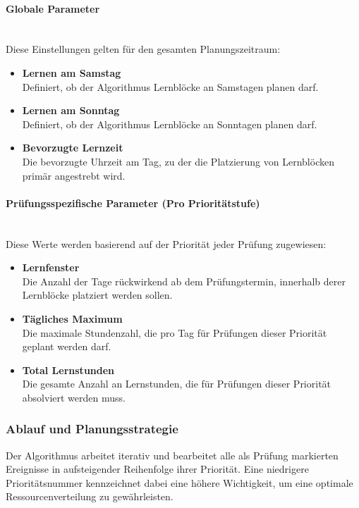 \documentclass[12pt,a4paper]{report}
\newcommand{\myparagraph}[1]{\paragraph{#1}\mbox{}\\}
\begin{document}
\myparagraph{Globale Parameter}
Diese Einstellungen gelten für den gesamten Planungszeitraum:
\begin{itemize}
    \item \textbf{Lernen am Samstag}\\
    Definiert, ob der Algorithmus Lernblöcke an Samstagen planen darf.
    \item \textbf{Lernen am Sonntag}\\
    Definiert, ob der Algorithmus Lernblöcke an Sonntagen planen darf.
    \item \textbf{Bevorzugte Lernzeit}\\
    Die bevorzugte Uhrzeit am Tag, zu der die Platzierung von Lernblöcken primär angestrebt wird.
\end{itemize}

\myparagraph{Prüfungsspezifische Parameter (Pro Prioritätstufe)}
Diese Werte werden basierend auf der Priorität jeder Prüfung zugewiesen:
\begin{itemize}
    \item \textbf{Lernfenster}\\
    Die Anzahl der Tage rückwirkend ab dem Prüfungstermin, innerhalb derer Lernblöcke platziert werden sollen.
    \item \textbf{Tägliches Maximum}\\
    Die maximale Stundenzahl, die pro Tag für Prüfungen dieser Priorität geplant werden darf.
    \item \textbf{Total Lernstunden}\\
    Die gesamte Anzahl an Lernstunden, die für Prüfungen dieser Priorität absolviert werden muss.
\end{itemize}

\subsubsection{Ablauf und Planungsstrategie}
Der Algorithmus arbeitet iterativ und bearbeitet alle als Prüfung markierten Ereignisse in aufsteigender Reihenfolge ihrer Priorität. Eine niedrigere Prioritätsnummer kennzeichnet dabei eine höhere Wichtigkeit, um eine optimale Ressourcenverteilung zu gewährleisten.
\end{document}

